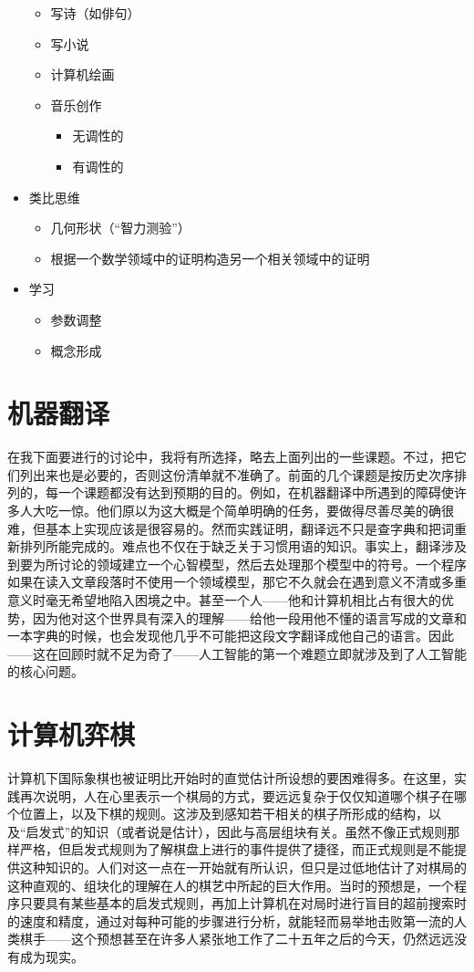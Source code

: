 \begin{itemize}
\begin{itemize}
  \item 写诗（如俳句）
  \item 写小说
  \item 计算机绘画
  \item 音乐创作
    \begin{itemize}
    \item 无调性的
    \item 有调性的
    \end{itemize}
  \end{itemize}
\item 类比思维
  \begin{itemize}
  \item 几何形状（“智力测验”）
  \item 根据一个数学领域中的证明构造另一个相关领域中的证明
  \end{itemize}
\item 学习
  \begin{itemize}
  \item 参数调整
  \item 概念形成
  \end{itemize}
\end{itemize}

\section{机器翻译}

在我下面要进行的讨论中，我将有所选择，略去上面列出的一些课题。不过，把它们列出来也是必要的，否则这份清单就不准确了。前面的几个课题是按历史次序排列的，每一个课题都没有达到预期的目的。例如，在机器翻译中所遇到的障碍使许多人大吃一惊。他们原以为这大概是个简单明确的任务，要做得尽善尽美的确很难，但基本上实现应该是很容易的。然而实践证明，翻译远不只是查字典和把词重新排列所能完成的。难点也不仅在于缺乏关于习惯用语的知识。事实上，翻译涉及到要为所讨论的领域建立一个心智模型，然后去处理那个模型中的符号。一个程序如果在读入文章段落时不使用一个领域模型，那它不久就会在遇到意义不清或多重意义时毫无希望地陷入困境之中。甚至一个人——他和计算机相比占有很大的优势，因为他对这个世界具有深入的理解——给他一段用他不懂的语言写成的文章和一本字典的时候，也会发现他几乎不可能把这段文字翻译成他自己的语言。因此——这在回顾时就不足为奇了——人工智能的第一个难题立即就涉及到了人工智能的核心问题。

\section{计算机弈棋}

计算机下国际象棋也被证明比开始时的直觉估计所设想的要困难得多。在这里，实践再次说明，人在心里表示一个棋局的方式，要远远复杂于仅仅知道哪个棋子在哪个位置上，以及下棋的规则。这涉及到感知若干相关的棋子所形成的结构，以及“启发式”的知识（或者说是估计），因此与高层组块有关。虽然不像正式规则那样严格，但启发式规则为了解棋盘上进行的事件提供了捷径，而正式规则是不能提供这种知识的。人们对这一点在一开始就有所认识，但只是过低地估计了对棋局的这种直观的、组块化的理解在人的棋艺中所起的巨大作用。当时的预想是，一个程序只要具有某些基本的启发式规则，再加上计算机在对局时进行盲目的超前搜索时的速度和精度，通过对每种可能的步骤进行分析，就能轻而易举地击败第一流的人类棋手——这个预想甚至在许多人紧张地工作了二十五年之后的今天，仍然远远没有成为现实。

